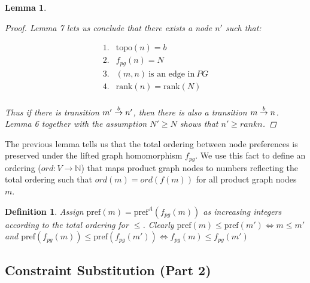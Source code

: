 \documentclass[twocolumn, openany]{sig-alternate-10pt}
\newcommand{\Pref}{\ensuremath{\mathrm{pref}}}
\newcommand{\Topo}{\ensuremath{\mathrm{topo}}}
\newcommand{\Rank}{\ensuremath{\mathrm{rank}}}
\newtheorem{defn}{Definition}
\newtheorem{lem}[thm]{Lemma}
\begin{document}
\begin{lem}
\begin{proof}
    Lemma 7 lets us conclude that there exists a node $n'$ such that:

    \[ \begin{array}{ll}
      1. & \Topo(n) = b \\
      2. & f_{pg}(n) = N \\
      3. & (m,n) ~\text{is an edge in}~ PG \\
      4. & \Rank(n) = \Rank(N) \\
    \end{array} \] 

    Thus if there is transition $\trans{m'}{n'}{b}$, then there is also a transition $\trans{m}{n}{b}$. Lemma 6 together with the assumption $N' \geq N$ shows that $n' \geq{rank} n$.

  \end{proof}

\end{lem}


\vspace{3em}

The previous lemma tells us that the total ordering between node preferences is preserved under the lifted graph homomorphism $f_{pg}$. 
We use this fact to define an ordering ($ord : V \rightarrow \mathbb{N}$) that maps product graph nodes to numbers reflecting the total ordering such that $ord(m) = ord(f(m))$ for all product graph nodes $m$.


\begin{defn}
  Assign $\Pref(m) = \Pref^A(f_{pg}(m))$ as increasing integers according to the total ordering for $\leq$.
  Clearly $\Pref(m) \leq \Pref(m') \iff m \leq m'$ and $\Pref(f_{pg}(m)) \leq \Pref(f_{pg}(m')) \iff f_{pg}(m) \leq f_{pg}(m')$
\end{defn}


\vspace{3em}
\subsection{Constraint Substitution (Part 2)}
\end{document}

